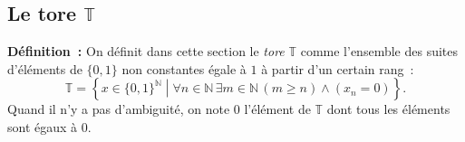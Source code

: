     \done

\subsection{Le tore \texorpdfstring{$\mathbb{T}$}{T}}

\noindent\textbf{Définition :} On définit dans cette section le \emph{tore} $\mathbb{T}$ comme l'ensemble des suites d'éléments de $\lbrace 0, 1 \rbrace$ non constantes égale à $1$ à partir d'un certain rang : 
\begin{equation*}
    \mathbb{T} = \left\lbrace
        x \in \lbrace 0, 1 \rbrace^{\mathbb{N}} 
        \middle\vert
        \forall n \in \mathbb{N} \, \exists m \in \mathbb{N} \, (m \geq n) \wedge (x_n = 0)
    \right\rbrace .
\end{equation*}
Quand il n'y a pas d'ambiguité, on note $0$ l'élément de $\mathbb{T}$ dont tous les éléments sont égaux à $0$.

